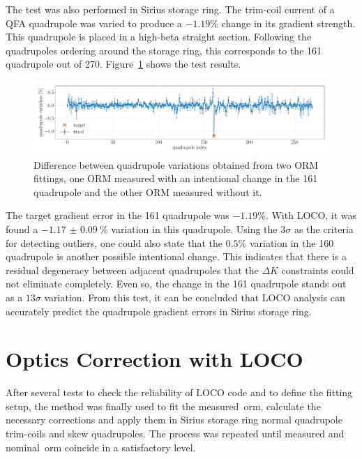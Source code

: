 The test was also performed in Sirius storage ring. The trim-coil current of a QFA quadrupole was varied to produce a $-1.19\%$ change in its gradient strength. This quadrupole is placed in a high-beta straight section. Following the quadrupoles ordering around the storage ring, this corresponds to the 161 quadrupole out of 270. Figure~\ref{fig:delta_13M1_qfa} shows the test results.
\begin{figure}
\centering
\includegraphics[width=1.0\textwidth]{figures/delta_13M1_QFA_errorbar.pdf}
\caption{Difference between quadrupole variations obtained from two ORM fittings, one ORM measured with an intentional change in the 161 quadrupole and the other ORM measured without it.}
\label{fig:delta_13M1_qfa}
\end{figure}

The target gradient error in the 161 quadrupole was $-1.19\%$. With LOCO, it was found a $\SI{-1.17(9)}{\%}$ variation in this quadrupole. Using the $3\sigma$ as the criteria for detecting outliers, one could also state that the $0.5\%$ variation in the 160 quadrupole is another possible intentional change. This indicates that there is a residual degeneracy between adjacent quadrupoles that the $\Delta K$ constraints could not eliminate completely. Even so, the change in the 161 quadrupole stands out as a $13\sigma$ variation. From this test, it can be concluded that LOCO analysis can accurately predict the quadrupole gradient errors in Sirius storage ring. 

\section{Optics Correction with LOCO}\label{sec:orm_fit}
After several tests to check the reliability of LOCO code and to define the fitting setup, the method was finally used to fit the measured~\gls{orm}, calculate the necessary corrections and apply them in Sirius storage ring normal quadrupole trim-coils and skew quadrupoles. The process was repeated until measured and nominal~\gls{orm} coincide in a satisfactory level.

